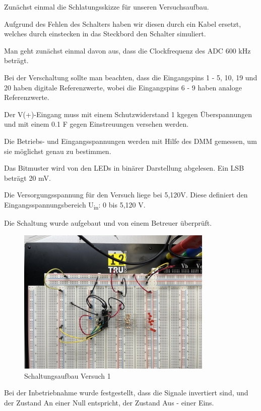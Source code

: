 Zunächst einmal die Schlatungsskizze für unseren Versuchsaufbau.

Aufgrund des Fehlen des Schalters haben wir diesen durch ein Kabel ersetzt, welches 
durch einstecken in das Steckbord den Schalter simuliert. \par

Man geht zunächst einmal davon aus, dass die Clockfrequenz des ADC 600 kHz beträgt.\par
Bei der Verschaltung sollte man beachten, dass die Eingangspins 1 - 5, 10, 19 und 20 
haben digitale Referenzwerte, wobei die Eingangspins 6 - 9 haben analoge Referenzwerte.\par
Der V(+)-Eingang muss mit einem Schutzwiderstand 1 k\textOmega  gegen Überspannungen 
und mit einem 0.1 \textmu F gegen Einstreuungen versehen werden. \par

Die Betriebs- und Eingangsspannungen werden mit Hilfe des \acs{DMM} gemessen, um sie möglichst 
genau zu bestimmen.\par
Das Bitmuster wird von den \acs{LED}s in binärer Darstellung abgelesen. Ein \acs{LSB} beträgt 20 mV.\par
Die Versorgungsspannung für den Versuch liege bei 5,120V. Diese definiert den 
Eingangsspannungsbereich U\textsubscript{in}: 0 bis 5,120 V. \newline


Die Schaltung wurde aufgebaut und von einem Betreuer überprüft.
\begin{figure}[H]
	\centering
	\includegraphics[height=7cm]{images/Schaltungsaufbau-versuch-eins.jpeg} 
	\caption[]{Schaltungsaufbau Versuch 1}
\end{figure}

Bei der Inbetriebnahme wurde festgestellt, dass die Signale invertiert sind, 
und der Zustand An einer Null entspricht, der Zustand Aus - einer Eins.

